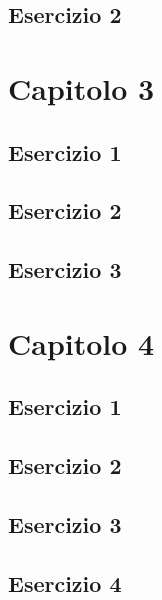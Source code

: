 \documentclass[a4paper,12pt,oneside]{book}
\begin{document}
\hypertarget{esercizio-2}{%
\subsection{Esercizio 2}\label{esercizio-2}}

\hypertarget{capitolo-3}{%
\section{Capitolo 3}\label{capitolo-3}}

\hypertarget{esercizio-1-1}{%
\subsection{Esercizio 1}\label{esercizio-1-1}}

\hypertarget{esercizio-2-1}{%
\subsection{Esercizio 2}\label{esercizio-2-1}}

\hypertarget{esercizio-3}{%
\subsection{Esercizio 3}\label{esercizio-3}}

\hypertarget{capitolo-4}{%
\section{Capitolo 4}\label{capitolo-4}}

\hypertarget{esercizio-1-2}{%
\subsection{Esercizio 1}\label{esercizio-1-2}}

\hypertarget{esercizio-2-2}{%
\subsection{Esercizio 2}\label{esercizio-2-2}}

\hypertarget{esercizio-3-1}{%
\subsection{Esercizio 3}\label{esercizio-3-1}}

\hypertarget{esercizio-4}{%
\subsection{Esercizio 4}\label{esercizio-4}}
\end{document}
